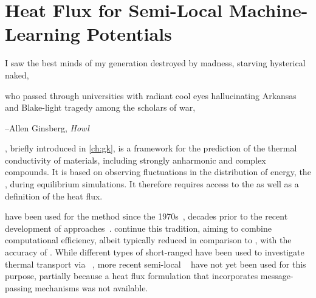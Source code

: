 
\part{Heat Flux for Semi-Local Machine-Learning Potentials}
\label{part:hf}

\thispagestyle{plain}
\begin{center}
  \begin{minipage}{0.8\textwidth}

    \vspace{4\baselineskip}
    
    \hangindent=1cm
    I saw the best minds of my generation destroyed by madness, starving hysterical naked, \el

    \hangindent=1cm
    who passed through universities with radiant cool eyes hallucinating Arkansas and Blake-light tragedy among the scholars of war, \el


    \vspace{\baselineskip}
    {\hfill\raggedright --Allen Ginsberg, \textit{Howl}\hspace{0.25cm}}
  \end{minipage}
\end{center}
\vspace{2\baselineskip}

, briefly introduced in \cref{ch:gk}, is a framework for the prediction of the thermal conductivity of materials, including strongly anharmonic and complex compounds.
It is based on observing fluctuations in the distribution of energy, the , during equilibrium \md simulations.
It therefore requires access to the \bo \pes as well as a definition of the heat flux.

\ffs have been used for the \gk method since the 1970s~\cite{lvk1973t,lmh1986t,vc1999t,c2006t,ggs2010t,fpdh2015t}, decades prior to the recent development of \aigk approaches~\cite{mub2016t,crs2017t}.
\mlps continue this tradition, aiming to combine computational efficiency, albeit typically reduced in comparison to \ffs, with the accuracy of \dft.
While different types of short-ranged \mlps{} have been used to investigate thermal transport via \gk{}~\cite{sdbb2012q,mcld2020q,knys2019q,lqzg2021q,lll2020q,llll2020q,qpwy2019q,vkjk2021q}, more recent semi-local \mlps{}~\cite{gsvd2017q,sktm2017q,sstm2018q,um2019q,kgg2020q,kbg2021q,ucsm2021q,bmsk2022q,bkoc2022q,bbkc2022a,blcd2022q} have not yet been used for this purpose, partially because a heat flux formulation that incorporates message-passing mechanisms was not available.

